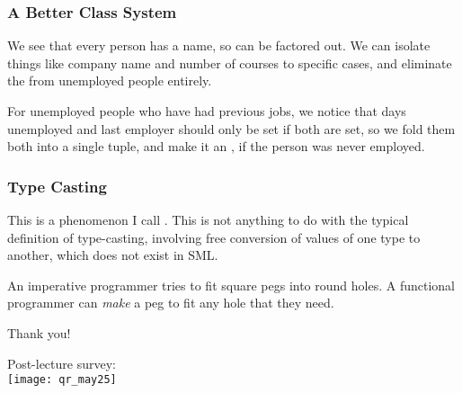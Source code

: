 \documentclass[aspectratio=169]{beamer}
\begin{document}
\begin{frame}[fragile]
  \frametitle{A Better Class System}

  We see that every person has a name, so  can be factored out. We 
  can isolate things like company name and number of courses to specific cases,
  and eliminate the  from unemployed people entirely.

  \pause
  \vspace{\fill}

  For unemployed people who have had previous jobs, we notice that days unemployed and
  last employer should only be set if both are set, so we fold them both into a 
  single tuple, and make it an , if the person was never employed.
\end{frame}

\begin{frame}[fragile]
  \frametitle{Type Casting}

  \tgs

  This is a phenomenon I call . This is not anything to do 
  with the typical definition of type-casting, involving free conversion of 
  values of one type to another, which does not exist in SML.

  \pause
  \vspace{\fill}


  \pause
  \vspace{\fill}

  An imperative programmer tries to fit square pegs into round holes. A 
  functional programmer can \textit{make} a peg to fit any hole that they need.
\end{frame}

\begin{frame}[plain]
	\begin{center} Thank you! \end{center}

	\begin{center} 
    Post-lecture survey: \\
    \vspace{5pt}
    \texttt{[image: qr\_may25]}
  \end{center}
\end{frame}
\end{document}
